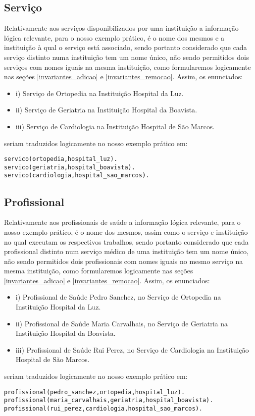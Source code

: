\documentclass[
  oneside,
  10pt, a4paper,
  footinclude=true,
  headinclude=true,
  cleardoublepage=empty
]{scrbook}
\begin{document}
        \subsection{Serviço}
Relativamente aos serviços disponibilizados por uma instituição a informação lógica relevante, para o nosso exemplo prático, é o nome dos mesmos e a instituição à qual o serviço está associado, sendo portanto considerado que cada serviço distinto numa instituição tem um nome único, não sendo permitidos dois serviços com nomes iguais na mesma instituição, como formularemos logicamente nas seções \ref{invariantes_adicao} e \ref{invariantes_remocao}.
        Assim, os enunciados:
\begin{itemize}
\item i) Serviço de Ortopedia na Instituição Hospital da Luz.
\item ii) Serviço de Geriatria na Instituição Hospital da Boavista.
\item iii) Serviço de Cardiologia na Instituição Hospital de São Marcos.
\end{itemize}
seriam traduzidos logicamente  no nosso exemplo prático em:
\begin{lstlisting}
servico(ortopedia,hospital_luz).
servico(geriatria,hospital_boavista).
servico(cardiologia,hospital_sao_marcos).
\end{lstlisting}
        
        
        \subsection{Profissional}
        Relativamente aos profissionais de saúde a informação lógica relevante, para o nosso exemplo prático, é o nome dos mesmos, assim como o serviço e instituição no qual executam os respectivos trabalhos, sendo portanto considerado que cada profissional distinto num serviço médico de uma instituição tem um nome único, não sendo permitidos dois profissionais com nomes iguais no mesmo serviço na mesma instituição, como formularemos logicamente nas seções \ref{invariantes_adicao} e \ref{invariantes_remocao}.
        Assim, os enunciados:
\begin{itemize}
\item i) Profissional de Saúde Pedro Sanchez, no Serviço de Ortopedia na Instituição Hospital da Luz.
\item ii) Profissional de Saúde Maria Carvalhais, no Serviço de Geriatria na Instituição Hospital da Boavista.
\item iii) Profissional de Saúde Rui Perez, no Serviço de Cardiologia na Instituição Hospital de São Marcos.
\end{itemize}
seriam traduzidos logicamente  no nosso exemplo prático em:
\begin{lstlisting}
profissional(pedro_sanchez,ortopedia,hospital_luz).
profissional(maria_carvalhais,geriatria,hospital_boavista).
profissional(rui_perez,cardiologia,hospital_sao_marcos).
\end{lstlisting}
\end{document}
